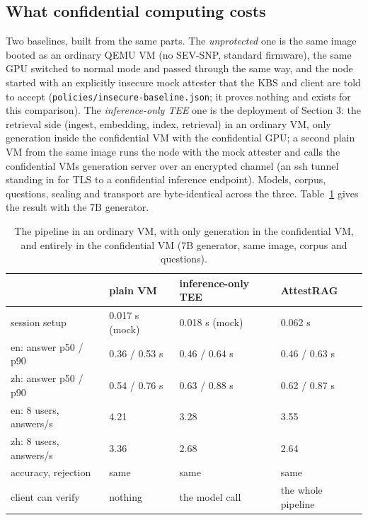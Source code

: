 \documentclass[letterpaper,twocolumn,10pt]{article}
\begin{document}
\subsection{What confidential computing costs}\label{what-confidential-computing-costs}

Two baselines, built from the same parts. The \emph{unprotected} one is the same image booted as an ordinary QEMU VM (no SEV-SNP, standard firmware), the same GPU switched to normal mode and passed through the same way, and the node started with an explicitly insecure mock attester that the KBS and client are told to accept (\texttt{policies/insecure-baseline.json}; it proves nothing and exists for this comparison). The \emph{inference-only TEE} one is the deployment of Section 3: the retrieval side (ingest, embedding, index, retrieval) in an ordinary VM, only generation inside the confidential VM with the confidential GPU; a second plain VM from the same image runs the node with the mock attester and calls the confidential VM\textquotesingle s generation server over an encrypted channel (an ssh tunnel standing in for TLS to a confidential inference endpoint). Models, corpus, questions, sealing and transport are byte-identical across the three. Table~\ref{tab:cost} gives the result with the 7B generator.

\begin{table}[t]\centering\small\setlength{\tabcolsep}{4pt}
\begin{tabular}{p{1.1in}p{0.6in}p{0.75in}p{0.65in}}\toprule
 & \textbf{plain VM} & \textbf{inference-only TEE} & \textbf{AttestRAG} \\ \midrule
session setup & 0.017 s (mock) & 0.018 s (mock) & 0.062 s \\
en: answer p50 / p90 & 0.36 / 0.53 s & 0.46 / 0.64 s & 0.46 / 0.63 s \\
zh: answer p50 / p90 & 0.54 / 0.76 s & 0.63 / 0.88 s & 0.62 / 0.87 s \\
en: 8 users, answers/s & 4.21 & 3.28 & 3.55 \\
zh: 8 users, answers/s & 3.36 & 2.68 & 2.64 \\
accuracy, rejection & same & same & same \\
client can verify & nothing & the model call & the whole pipeline \\
\bottomrule\end{tabular}
\caption{The pipeline in an ordinary VM, with only generation in the confidential VM, and entirely in the confidential VM (7B generator, same image, corpus and questions).}\label{tab:cost}
\end{table}
\end{document}

